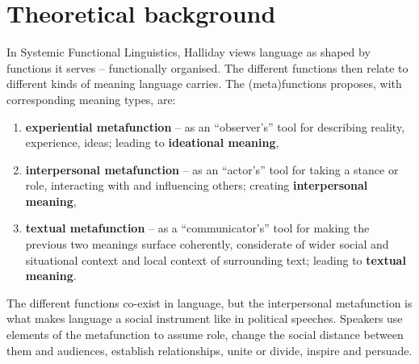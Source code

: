 \documentclass[11pt]{article}
\begin{document}
\section{Theoretical background}{
	In Systemic Functional Linguistics, Halliday views language as shaped by functions it serves -- functionally organised. The different functions then relate to different kinds of meaning language carries.
	The (meta)functions \citet{Halliday1970IM} proposes, with corresponding meaning types, are:
	\begin{enumerate}
		\item \textbf{experiential metafunction} -- as an ``observer's'' tool for describing reality, experience, ideas; leading to \textbf{ideational meaning},
		\item \textbf{interpersonal metafunction} -- as an ``actor's'' tool for taking a stance or role, interacting with and influencing others; creating \textbf{interpersonal meaning},
		\item \textbf{textual metafunction} -- as a ``communicator's'' tool for making the previous two meanings surface coherently, considerate of wider social and situational context and local context of surrounding text; leading to \textbf{textual meaning}.
	\end{enumerate}
	The different functions co-exist in language, but the interpersonal metafunction is what makes language a social instrument like in political speeches. Speakers use elements of the metafunction to assume role, change the social distance between them and audiences, establish relationships, unite or divide, inspire and persuade.
}
\end{document}
